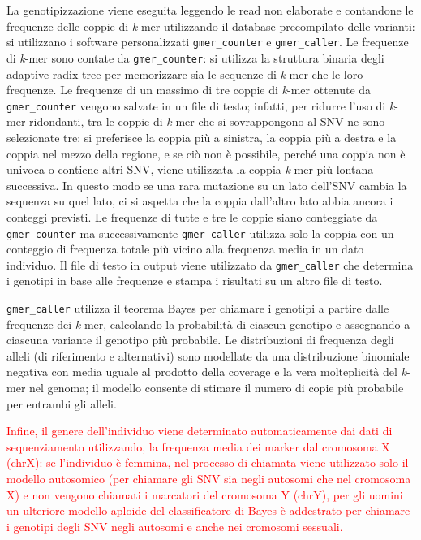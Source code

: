 \documentclass[../main.tex]{subfiles}
\begin{document}
\noindent
La genotipizzazione viene eseguita leggendo le read non elaborate e contandone le frequenze delle coppie di \textit{k}-mer utilizzando il database precompilato delle varianti: si utilizzano i software personalizzati \texttt{gmer\_counter} e \texttt{gmer\_caller}. Le frequenze di \textit{k}-mer sono contate da \texttt{gmer\_counter}: si utilizza la struttura binaria degli adaptive radix tree per memorizzare sia le sequenze di \textit{k}-mer che le loro frequenze. Le frequenze di un massimo di tre coppie di \textit{k}-mer ottenute da \texttt{gmer\_counter} vengono salvate in un file di testo; infatti, per ridurre l'uso di \textit{k}-mer ridondanti, tra le coppie di \textit{k}-mer che si sovrappongono al SNV ne sono selezionate tre: si preferisce la coppia più a sinistra, la coppia più a destra e la coppia nel mezzo della regione, e se ciò non è possibile, perché una coppia non è univoca o contiene altri SNV, viene utilizzata la coppia \textit{k}-mer più lontana successiva. In questo modo se una rara mutazione su un lato dell'SNV cambia la sequenza su quel lato, ci si aspetta che la coppia dall'altro lato abbia ancora i conteggi previsti. Le frequenze di tutte e tre le coppie siano conteggiate da \texttt{gmer\_counter} ma successivamente \texttt{gmer\_caller} utilizza solo la coppia con un conteggio di frequenza totale più vicino alla frequenza media in un dato individuo. Il file di testo in output viene utilizzato da \texttt{gmer\_caller} che determina i genotipi in base alle frequenze e stampa i risultati su un altro file di testo. 

\texttt{gmer\_caller} utilizza il teorema Bayes per chiamare i genotipi a partire dalle frequenze dei \textit{k}-mer, calcolando la probabilità di ciascun genotipo e assegnando a ciascuna variante il genotipo più probabile. Le distribuzioni di frequenza degli alleli (di riferimento e alternativi) sono modellate da una distribuzione binomiale negativa con media uguale al prodotto della coverage e la vera molteplicità del \textit{k}-mer nel genoma; il modello consente di stimare il numero di copie più probabile per entrambi gli alleli. 

\textcolor{red}{Infine, il genere dell'individuo viene determinato automaticamente dai dati di sequenziamento utilizzando, la frequenza media dei marker dal cromosoma X (chrX): se l'individuo è femmina, nel processo di chiamata viene utilizzato solo il modello autosomico (per chiamare gli SNV sia negli autosomi che nel cromosoma X) e non vengono chiamati i marcatori del cromosoma Y (chrY), per gli uomini un ulteriore modello aploide del classificatore di Bayes è addestrato per chiamare i genotipi degli SNV negli autosomi e anche nei cromosomi sessuali.}
\end{document}
